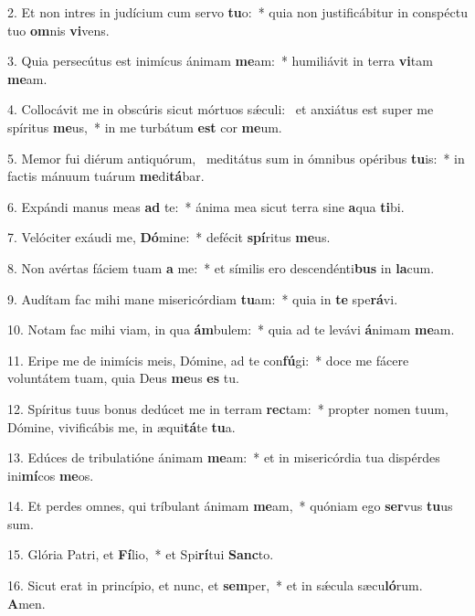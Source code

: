2. Et non intres in judícium cum servo \textbf{tu}o:~*  quia non justificábitur in conspéctu tuo \textbf{om}nis \textbf{vi}vens.\

3. Quia persecútus est inimícus ánimam \textbf{me}am:~*  humiliávit in terra \textbf{vi}tam \textbf{me}am.\

4. Collocávit me in obscúris sicut mórtuos sǽculi: \dag\  et anxiátus est super me spíritus \textbf{me}us,~*  in me turbátum \textbf{est} cor \textbf{me}um.\

5. Memor fui diérum antiquórum, \dag\  meditátus sum in ómnibus opéribus \textbf{tu}is:~*  in factis mánuum tuárum \textbf{me}di\textbf{tá}bar.\

6. Expándi manus meas \textbf{ad} te:~*  ánima mea sicut terra sine \textbf{a}qua \textbf{ti}bi.\

7. Velóciter exáudi me, \textbf{Dó}mine:~*  defécit \textbf{spí}ritus \textbf{me}us.\

8. Non avértas fáciem tuam \textbf{a} me:~*  et símilis ero descendénti\textbf{bus} in \textbf{la}cum.\

9. Audítam fac mihi mane misericórdiam \textbf{tu}am:~*  quia in \textbf{te} spe\textbf{rá}vi.\

10. Notam fac mihi viam, in qua \textbf{ám}bulem:~*  quia ad te levávi \textbf{á}nimam \textbf{me}am.\

11. Eripe me de inimícis meis, Dómine, ad te con\textbf{fú}gi:~*  doce me fácere voluntátem tuam, quia Deus \textbf{me}us \textbf{es} tu.\

12. Spíritus tuus bonus dedúcet me in terram \textbf{rec}tam:~*  propter nomen tuum, Dómine, vivificábis me, in æqui\textbf{tá}te \textbf{tu}a.\

13. Edúces de tribulatióne ánimam \textbf{me}am:~*  et in misericórdia tua dispérdes ini\textbf{mí}cos \textbf{me}os.\

14. Et perdes omnes, qui tríbulant ánimam \textbf{me}am,~*  quóniam ego \textbf{ser}vus \textbf{tu}us sum.\

15. Glória Patri, et \textbf{Fí}lio,~*  et Spi\textbf{rí}tui \textbf{Sanc}to.\

16. Sicut erat in princípio, et nunc, et \textbf{sem}per,~*  et in sǽcula sæcu\textbf{ló}rum. \textbf{A}men.\

